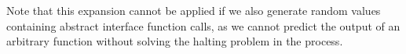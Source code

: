 Note that this expansion cannot be applied if we also generate random values
containing abstract interface function calls, as we cannot predict the output of
an arbitrary function without solving the halting problem in the process.


